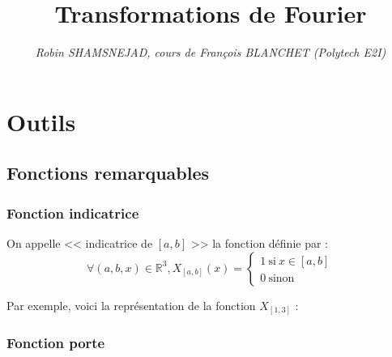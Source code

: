 \documentclass[12pt, a4paper]{article}
\title{\textbf{Transformations de Fourier}}
\author{\textit{Robin SHAMSNEJAD, cours de François BLANCHET (Polytech E2I)}}
\date{}
\begin{document}
\maketitle

\tableofcontents
\clearpage

\section{Outils}

\subsection{Fonctions remarquables}

\subsubsection{Fonction indicatrice}

\begin{tcolorbox}
	On appelle << indicatrice de $[a, b]$ >> la fonction définie par :
	\begin{equation*}
		\forall (a, b, x) \in \mathbb{R}^3, X_{[a, b]}(x) =
		\begin{cases}
			1 ~ \text{si} ~ x \in [a, b] \\
			0 ~ \text{sinon}
		\end{cases}
	\end{equation*}
\end{tcolorbox}

Par exemple, voici la représentation de la fonction $X_{[1, 3]}$ :

\begin{center}
\end{center}

\subsubsection{Fonction porte}
\end{document}
